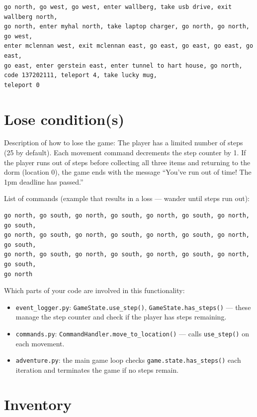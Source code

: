 \documentclass[11pt]{article}
\begin{document}
\begin{verbatim}
go north, go west, go west, enter wallberg, take usb drive, exit wallberg north,
go north, enter myhal north, take laptop charger, go north, go north, go west,
enter mclennan west, exit mclennan east, go east, go east, go east, go east,
go east, enter gerstein east, enter tunnel to hart house, go north,
code 137202111, teleport 4, take lucky mug,
teleport 0
\end{verbatim}

\section*{Lose condition(s)}
Description of how to lose the game: The player has a limited number of steps (25 by default). Each movement command decrements the step counter by 1. If the player runs out of steps before collecting all three items and returning to the dorm (location 0), the game ends with the message ``You've run out of time! The 1pm deadline has passed.''

List of commands (example that results in a loss --- wander until steps run out):
\begin{verbatim}
go north, go south, go north, go south, go north, go south, go north, go south,
go north, go south, go north, go south, go north, go south, go north, go south,
go north, go south, go north, go south, go north, go south, go north, go south,
go north
\end{verbatim}

Which parts of your code are involved in this functionality:
\begin{itemize}
    \item \verb|event_logger.py|: \verb|GameState.use_step()|, \verb|GameState.has_steps()| --- these manage the step counter and check if the player has steps remaining.
    \item \verb|commands.py|: \verb|CommandHandler.move_to_location()| --- calls \verb|use_step()| on each movement.
    \item \verb|adventure.py|: the main game loop checks \verb|game.state.has_steps()| each iteration and terminates the game if no steps remain.
\end{itemize}

\section*{Inventory}
\end{document}
